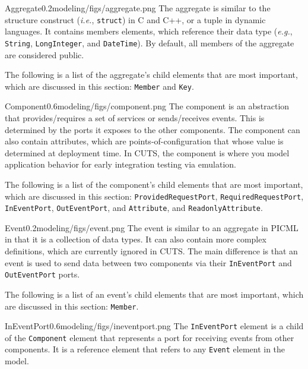\begin{modelelement}{Aggregate}{0.2}{modeling/figs/aggregate.png}
The aggregate is similar to the structure construct (\textit{i.e.}, 
\texttt{struct}) in C and C++, or a tuple in dynamic languages. It 
contains members elements, which reference their data type (\textit{e.g.}, 
\texttt{String}, \texttt{LongInteger}, and \texttt{DateTime}). By
default, all members of the aggregate are considered public.

The following is a list of the aggregate's child elements that
are most important, which are discussed in this section: 
\texttt{Member} and \texttt{Key}.
\end{modelelement}

\begin{modelelement}{Component}{0.6}{modeling/figs/component.png}
The component is an abstraction that provides/\-requires 
a set of services or sends/\-receives events. This is determined by
the ports it exposes to the other components. The component can
also contain attributes, which are points-of-configuration that
whose value is determined at deployment time. In CUTS, the component 
is where you model application behavior for early integration
testing via emulation. 

The following is a list of the component's child elements that
are most important, which are discussed in this section: 
\texttt{ProvidedRequestPort}, \texttt{RequiredRequestPort},
\texttt{InEventPort}, \texttt{OutEventPort}, and \texttt{At\-tri\-bute},
and \texttt{Read\-onlyAt\-tri\-bute}.
\end{modelelement}

\clearpage

\begin{modelelement}{Event}{0.2}{modeling/figs/event.png}
The event is similar to an aggregate in PICML in 
that it is a collection of data types. It can also contain 
more complex definitions, which are currently ignored in
CUTS. The main difference is that an event is used to send
data between two components via their \texttt{InEventPort}
and \texttt{Out\-Event\-Port} ports. 

The following is a 
list of an event's child elements that are most important, 
which are discussed in this section: \texttt{Member}.
\end{modelelement}

\begin{modelelement}{InEventPort}{0.6}{modeling/figs/ineventport.png}
The \texttt{InEventPort} element is a child of the \texttt{Component}
element that represents a port for receiving events from other components.
It is a reference element that refers to any \texttt{Event} element in
the model.
\end{modelelement}

